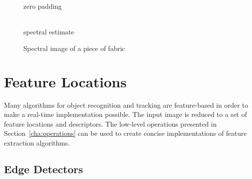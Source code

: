 \documentclass[12pt,a4paper,oneside,openright]{book}
\newcommand{\sct}[1]{Section~\ref{cha:#1}}
\begin{document}
\begin{CJK}{UTF8}{}
\begin{figure}[htbp]
\begin{center}
\begin{minipage}[t]{.48\textwidth}
\begin{center}
         zero padding
       \end{center}
     \end{minipage}
     \begin{minipage}[t]{.48\textwidth}
       \begin{center}
         \\
         spectral estimate
       \end{center}
     \end{minipage}
     \caption{Spectral image of a piece of fabric\label{fig:spectrum}}
   \end{center}
\end{figure}

\section{Feature Locations}\label{cha:featloc}
Many algorithms for object recognition and tracking are feature-based in order to make a real-time implementation possible. The input image is reduced to a set of feature locations and descriptors. The low-level operations presented in \sct{operations} can be used to create concise implementations of feature extraction algorithms.

\subsection{Edge Detectors}

\end{CJK}
\end{document}
